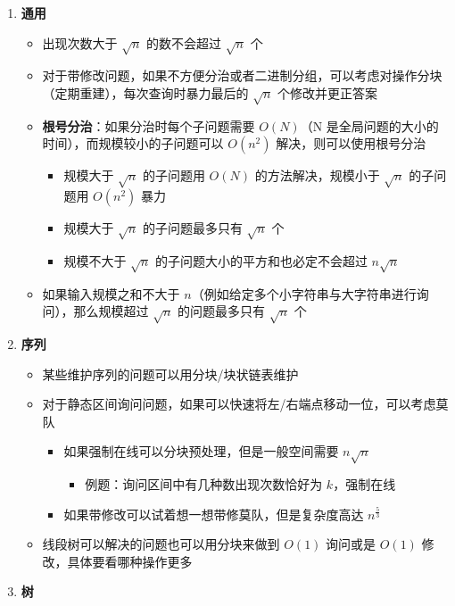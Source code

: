 \begin{enumerate}

\item \textbf{通用}

\begin{itemize}
	\item 出现次数大于 $\sqrt n$ 的数不会超过 $\sqrt n$ 个
	\item 对于带修改问题，如果不方便分治或者二进制分组，可以考虑对操作分块（定期重建），每次查询时暴力最后的 $\sqrt n$ 个修改并更正答案
	\item \textbf{根号分治}：如果分治时每个子问题需要 $O(N)$（N 是全局问题的大小的时间），而规模较小的子问题可以 $O(n^2)$ 解决，则可以使用根号分治
		\begin{itemize}
			\item 规模大于 $\sqrt n$ 的子问题用 $O(N)$ 的方法解决，规模小于 $\sqrt n$ 的子问题用 $O(n^2)$ 暴力
			\item 规模大于 $\sqrt n$ 的子问题最多只有 $\sqrt n$ 个
			\item 规模不大于 $\sqrt n$ 的子问题大小的平方和也必定不会超过 $n\sqrt n$
		\end{itemize}
	\item 如果输入规模之和不大于 $n$（例如给定多个小字符串与大字符串进行询问），那么规模超过 $\sqrt n$ 的问题最多只有 $\sqrt n$ 个
\end{itemize}

\item \textbf{序列}

\begin{itemize}
	\item 某些维护序列的问题可以用分块/块状链表维护
	\item 对于静态区间询问问题，如果可以快速将左/右端点移动一位，可以考虑莫队
		\begin{itemize}
			\item 如果强制在线可以分块预处理，但是一般空间需要 $n\sqrt n$ 
				\begin{itemize}
					\item 例题：询问区间中有几种数出现次数恰好为 $k$，强制在线
				\end{itemize}
			\item 如果带修改可以试着想一想带修莫队，但是复杂度高达 $n^{\frac 5 3}$
		\end{itemize}
	\item 线段树可以解决的问题也可以用分块来做到 $O(1)$ 询问或是 $O(1)$ 修改，具体要看哪种操作更多
\end{itemize}

\item \textbf{树}


\end{enumerate}
